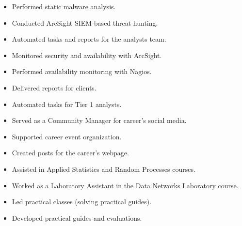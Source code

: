 \divider

\begin{itemize}
  \item Performed static malware analysis.
  \item Conducted ArcSight SIEM-based threat hunting.
  \item Automated tasks and reports for the analysts team.
\end{itemize}

\divider

\begin{itemize}
  \item Monitored security and availability with ArcSight.
  \item Performed availability monitoring with Nagios.
  \item Delivered reports for clients.
  \item Automated tasks for Tier 1 analysts.
\end{itemize}

\divider

\begin{itemize}
  \item Served as a Community Manager for career's social media.
  \item Supported career event organization.
  \item Created posts for the career's webpage.
\end{itemize}

\divider

\begin{itemize}
  \item Assisted in Applied Statistics and Random Processes courses.
  \item Worked as a Laboratory Assistant in the Data Networks Laboratory course.
  \item Led practical classes (solving practical guides).
  \item Developed practical guides and evaluations.
\end{itemize}

